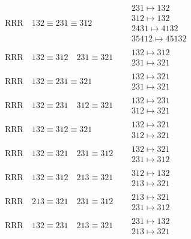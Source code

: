 \documentclass{article}
\begin{document}
\begin{align}
\text{RRR}
\quad
132\equiv231\equiv312
\quad
&
\begin{matrix}
231 \mapsto 132
\\
312 \mapsto 132
\\
2431 \mapsto 4132
\\
35412 \mapsto 45132
\end{matrix}
\\
\text{RRR}
\quad
132\equiv312
\quad
231\equiv321
\quad
&
\begin{matrix}
132 \mapsto 312
\\
231 \mapsto 321
\end{matrix}
\\
\text{RRR}
\quad
132\equiv231\equiv321
\quad
&
\begin{matrix}
132 \mapsto 321
\\
231 \mapsto 321
\end{matrix}
\\
\text{RRR}
\quad
132\equiv231
\quad
312\equiv321
\quad
&
\begin{matrix}
132 \mapsto 231
\\
312 \mapsto 321
\end{matrix}
\\
\text{RRR}
\quad
132\equiv312\equiv321
\quad
&
\begin{matrix}
132 \mapsto 321
\\
312 \mapsto 321
\end{matrix}
\\
\text{RRR}
\quad
132\equiv321
\quad
231\equiv312
\quad
&
\begin{matrix}
132 \mapsto 321
\\
231 \mapsto 312
\end{matrix}
\\
\text{RRR}
\quad
132\equiv312
\quad
213\equiv321
\quad
&
\begin{matrix}
312 \mapsto 132
\\
213 \mapsto 321
\end{matrix}
\\
\text{RRR}
\quad
213\equiv321
\quad
231\equiv312
\quad
&
\begin{matrix}
213 \mapsto 321
\\
231 \mapsto 312
\end{matrix}
\\
\text{RRR}
\quad
132\equiv231
\quad
213\equiv321
\quad
&
\begin{matrix}
231 \mapsto 132
\\
213 \mapsto 321
\end{matrix}

\end{align}
\end{document}
